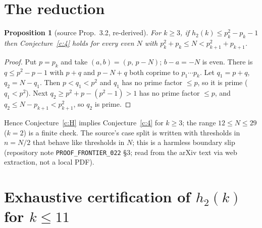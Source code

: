 \documentclass[11pt]{article}
\newtheorem{prop}{Proposition}\newtheorem{conj}{Conjecture}\theoremstyle{definition}\newtheorem{defn}{Definition}
\newcommand{\hh}{h_2}\newcommand{\wt}{\omega_2}
\begin{document}
\section{The reduction}
\begin{prop}[source Prop.~3.2, re-derived]\label{p:red} For $k\ge3$, if $\hh(k)\le p_k^2-p_k-1$ then Conjecture~\ref{c:4} holds for every even $N$ with $p_k^2+p_k\le N<p_{k+1}^2+p_{k+1}$.\end{prop}
\begin{proof} Put $p=p_k$ and take $(a,b)=(p,\,p-N)$; $b-a=-N$ is even. There is $q\le p^2-p-1$ with $p+q$ and $p-N+q$ both coprime to $p_1\cdots p_k$. Let $q_1=p+q$, $q_2=N-q_1$. Then $p<q_1<p^2$ and $q_1$ has no prime factor $\le p$, so it is prime ($q_1<p^2$). Next $q_2\ge p^2+p-(p^2-1)>1$ has no prime factor $\le p$, and $q_2\le N-p_{k+1}<p_{k+1}^2$, so $q_2$ is prime.\end{proof}
Hence Conjecture~\ref{c:H} implies Conjecture~\ref{c:4} for $k\ge3$; the range $12\le N\le29$ ($k=2$) is a finite check. The source's case split is written with thresholds in $n=N/2$ that behave like thresholds in $N$; this is a harmless boundary slip (repository note \texttt{PROOF\_FRONTIER\_022} \S3; read from the arXiv text via web extraction, not a local PDF).

\section{Exhaustive certification of $\hh(k)$ for $k\le11$}\label{sec:comp}
\end{document}
